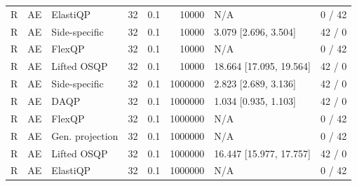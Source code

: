 \begin{longtable}{@{}lllrrrlr@{}}
R & AE & ElastiQP & 32 & 0.1 & 10000 & N/A & 0 / 42 \\
R & AE & Side-specific & 32 & 0.1 & 10000 & 3.079 [2.696, 3.504] & 42 / 0 \\
R & AE & FlexQP & 32 & 0.1 & 10000 & N/A & 0 / 42 \\
R & AE & Lifted OSQP & 32 & 0.1 & 10000 & 18.664 [17.095, 19.564] & 42 / 0 \\
R & AE & Side-specific & 32 & 0.1 & 1000000 & 2.823 [2.689, 3.136] & 42 / 0 \\
R & AE & DAQP & 32 & 0.1 & 1000000 & 1.034 [0.935, 1.103] & 42 / 0 \\
R & AE & FlexQP & 32 & 0.1 & 1000000 & N/A & 0 / 42 \\
R & AE & Gen. projection & 32 & 0.1 & 1000000 & N/A & 0 / 42 \\
R & AE & Lifted OSQP & 32 & 0.1 & 1000000 & 16.447 [15.977, 17.757] & 42 / 0 \\
R & AE & ElastiQP & 32 & 0.1 & 1000000 & N/A & 0 / 42 \\
\end{longtable}
\endgroup
